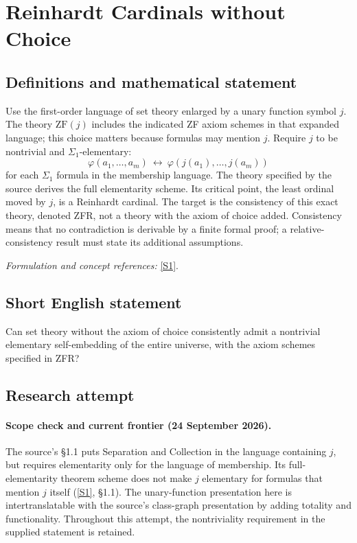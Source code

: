 \documentclass[11pt]{article}
\newcommand{\sref}[2]{\hyperlink{source:#1:#2}{[S#2]}}
\newif\ifshowcatalogue
\newcommand{\cataloguescope}[1]{\ifshowcatalogue
 \paragraph{Exact scope in the supplied catalogue.}
 \begin{quote}\small #1\end{quote}\fi}
\begin{document}
\setcounter{section}{0}
\clearpage
\section*{\texorpdfstring{Reinhardt Cardinals without Choice}{Reinhardt Cardinals without Choice}}\label{statement}
\subsection{Definitions and mathematical statement}
Use the first-order language of set theory enlarged by a unary function symbol $j$. The theory $\mathrm{ZF}(j)$ includes the indicated ZF axiom schemes in that expanded language; this choice matters because formulas may mention $j$. Require $j$ to be nontrivial and $\Sigma_1$-elementary:
\[
 \varphi(a_1,\ldots,a_m)\ \longleftrightarrow\
 \varphi(j(a_1),\ldots,j(a_m))
\]
for each $\Sigma_1$ formula in the membership language. The theory specified by the source derives the full elementarity scheme. Its critical point, the least ordinal moved by $j$, is a Reinhardt cardinal. The target is the consistency of this exact theory, denoted ZFR, not a theory with the axiom of choice added. Consistency means that no contradiction is derivable by a finite formal proof; a relative-consistency result must state its additional assumptions.
\par\smallskip\textit{Formulation and concept references:} \sref{statement}{1}.
\cataloguescope{Determine whether ZFR is consistent, where ZFR is the first-order theory ZF(j) plus the assertion that a nontrivial function symbol j:V->V is Sigma\_1-elementary and hence fully elementary as a theorem scheme.}
\subsection{Short English statement}
Can set theory without the axiom of choice consistently admit a nontrivial elementary self-embedding of the entire universe, with the axiom schemes specified in ZFR?
\subsection{Research attempt}

\paragraph{Scope check and current frontier (24 September 2026).}
The source's \S1.1 puts Separation and Collection in the language containing
$j$, but requires elementarity only for the language of membership.  Its
full-elementarity theorem scheme does not make $j$ elementary for formulas
that mention $j$ itself (\sref{statement}{1}, \S1.1).  The unary-function presentation
here is intertranslatable with the source's class-graph presentation by adding
totality and functionality.  Throughout this attempt, the nontriviality
requirement in the supplied statement is retained.
\end{document}
